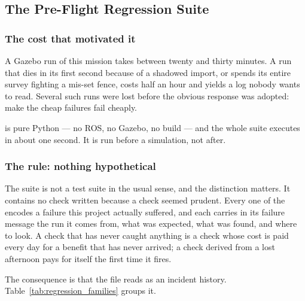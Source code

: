 \subsection{The Pre-Flight Regression Suite}
\label{sec:regression}

\subsubsection{The cost that motivated it}

A Gazebo run of this mission takes between twenty and thirty minutes. A run
that dies in its first second because of a shadowed import, or spends its
entire survey fighting a mis-set fence, costs half an hour and yields a log
nobody wants to read. Several such runs were lost before the obvious response
was adopted: make the cheap failures fail cheaply.

 is pure Python --- no ROS, no
Gazebo, no build --- and the whole suite executes in about one second. It is
run before a simulation, not after.

\subsubsection{The rule: nothing hypothetical}

The suite is not a test suite in the usual sense, and the distinction matters.
It contains no check written because a check seemed prudent. Every one of the
 encodes a failure this project actually suffered, and each
carries in its failure message the run it comes from, what was expected, what
was found, and where to look. A check that has never caught anything is a
check whose cost is paid every day for a benefit that has never arrived; a
check derived from a lost afternoon pays for itself the first time it fires.

The consequence is that the file reads as an incident history.
Table~\ref{tab:regression_families} groups it.

